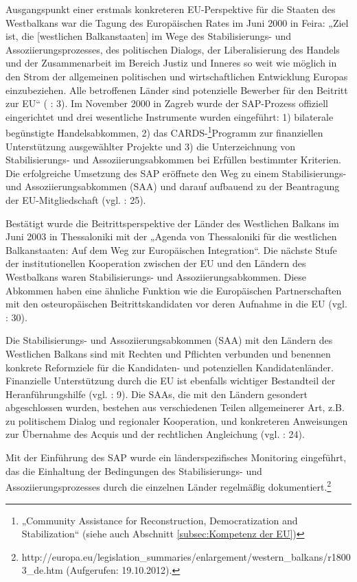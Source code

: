 Ausgangspunkt einer erstmals konkreteren EU-Perspektive für die Staaten des Westbalkans war die Tagung des Europäischen Rates im Juni 2000 in Feira: „Ziel ist, die [westlichen Balkanstaaten] im Wege des Stabilisierungs- und Assoziierungsprozesses, des politischen Dialogs, der Liberalisierung des Handels und der Zusammenarbeit im Bereich Justiz und Inneres so weit wie möglich in den Strom der allgemeinen politischen und wirtschaftlichen Entwicklung Europas einzubeziehen. Alle betroffenen Länder sind potenzielle Bewerber für den Beitritt zur EU“ (\cite{euko05} : 3). Im November 2000 in Zagreb wurde der SAP-Prozess offiziell eingerichtet und drei wesentliche Instrumente wurden eingeführt: 1) bilaterale begünstigte Handelsabkommen, 2) das CARDS-\footnote{„Community Assistance for Reconstruction, Democratization and Stabilization“ (siehe auch Abschnitt \ref{subsec:Kompetenz der EU})}Programm zur finanziellen Unterstützung ausgewählter Projekte und 3) die Unterzeichnung von Stabilisierungs- und Assoziierungsabkommen bei Erfüllen bestimmter Kriterien. Die erfolgreiche Umsetzung des SAP eröffnete den Weg zu einem Stabilisierungs- und Assoziierungsabkommen (SAA) und darauf aufbauend zu der Beantragung der EU-Mitgliedschaft (vgl. \cite{inotai} : 25). \par
Bestätigt wurde die Beitrittsperspektive der Länder des Westlichen Balkans im Juni 2003 in Thessaloniki mit der „Agenda von Thessaloniki für die westlichen Balkanstaaten: Auf dem Weg zur Europäischen Integration“. Die nächste Stufe der institutionellen Kooperation zwischen der EU und den Ländern des Westbalkans waren Stabilisierungs- und Assoziierungsabkommen. Diese Abkommen haben eine ähnliche Funktion wie die Europäischen Partnerschaften mit den osteuropäischen Beitrittskandidaten vor deren Aufnahme in die EU (vgl. \cite{inotai} : 30).\par
Die Stabilisierungs- und Assoziierungsabkommen (SAA) mit den Ländern des Westlichen Balkans sind mit Rechten und Pflichten verbunden und benennen konkrete Reformziele für die Kandidaten- und potenziellen Kandidatenländer. Finanzielle Unterstützung durch die EU ist ebenfalls wichtiger Bestandteil der Heranführungshilfe (vgl. \cite{euko07} : 9). Die SAAs, die mit den Ländern gesondert abgeschlossen wurden, bestehen aus verschiedenen Teilen allgemeinerer Art, z.B. zu politischem Dialog und regionaler Kooperation, und konkreteren Anweisungen zur Übernahme des Acquis und der rechtlichen Angleichung (vgl. \cite{marwedel} : 24).\par
Mit der Einführung des SAP wurde ein länderspezifisches Monitoring eingeführt, das die Einhaltung der Bedingungen des Stabilisierungs- und Assoziierungsprozesses durch die einzelnen Länder regelmäßig dokumentiert.\footnote{http://europa.eu/legislation\_summaries/enlargement/western\_balkans/r18003\_de.htm (Aufgerufen: 19.10.2012).}\par
